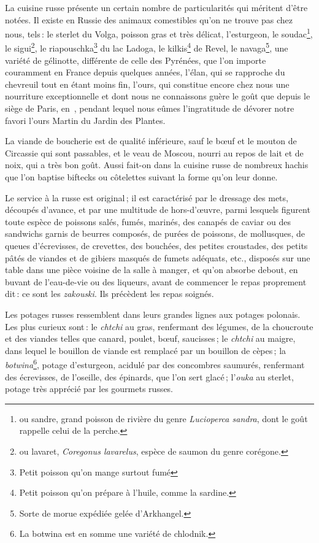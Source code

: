 La cuisine russe présente un certain nombre de particularités qui méritent
d'être notées. Il existe en Russie des animaux comestibles qu'on ne trouve pas
chez nous, tels : le sterlet du Volga, poisson gras et très délicat,
l’esturgeon, le soudac\footnote{ou sandre, grand poisson de rivière du genre
\textit{Lucioperca sandra}, dont le goût rappelle celui de la perche.}, le
sigui\footnote{ou lavaret, \textit{Coregonus lavarelus}, espèce de saumon du
genre corégone.}, le riapouschka\footnote{Petit poisson qu'on mange surtout
fumé} du lac Ladoga, le kilkis\footnote{Petit poisson qu'on prépare à l'huile,
comme la sardine.} de Revel, le navaga\footnote{Sorte de morue expédiée gelée
d'Arkhangel.}, une variété de gélinotte, différente de celle des Pyrénées, que
l’on importe couramment en France depuis quelques années, l'élan, qui se
rapproche du chevreuil tout en étant moins fin, l'ours, qui constitue encore
chez nous une nourriture exceptionnelle et dont nous ne connaissons guère le
goût que depuis le siège de Paris, en {\mmm} {\mmm}, pendant lequel
nous eûmes l'ingratitude de dévorer notre favori l'ours Martin du Jardin des
Plantes.

La viande de boucherie est de qualité inférieure, sauf le bœuf et le mouton de
Circassie qui sont passables, et le veau de Moscou, nourri au repos de lait et de
noix, qui a très bon goût. Aussi fait-on dans la cuisine russe de nombreux hachis
que l'on baptise biftecks ou côtelettes suivant la forme qu'on leur donne.

Le service à la russe est original ; il est caractérisé par le dressage des mets,
découpés d'avance, et par une multitude de hors-d'œuvre, parmi lesquels
figurent toute espèce de poissons salés, fumés, marinés, des canapés de caviar ou
des sandwichs garnis de beurres composés, de purées de poissons, de mollusques,
de queues d'écrevisses, de crevettes, des bouchées, des petites croustades, des
petits pâtés de viandes et de gibiers masqués de fumets adéquats, etc., disposés
sur une table dans une pièce voisine de la salle à manger, et qu'on absorbe
debout, en buvant de l'eau-de-vie ou des liqueurs, avant de commencer le repas
proprement dit : ce sont les \textit{zakouski}. Ils précèdent les repas soignés.

Les potages russes ressemblent dans leurs grandes lignes aux potages polonais.
Les plus curieux sont : le \textit{chtchi} au gras, renfermant des légumes, de
la choucroute et des viandes telles que canard, poulet, bœuf, saucisses ; le
\textit{chtchi} au maigre, dans lequel le bouillon de viande est remplacé par
un bouillon de cèpes ; la \textit{botwina}\footnote{La botwina est en somme une
variété de chlodnik.}, potage d'esturgeon, acidulé par des concombres saumurés,
renfermant des écrevisses, de l'oseille, des épinards, que l'on sert glacé ;
l'\textit{ouka} au sterlet, potage très apprécié par les gourmets russes.


